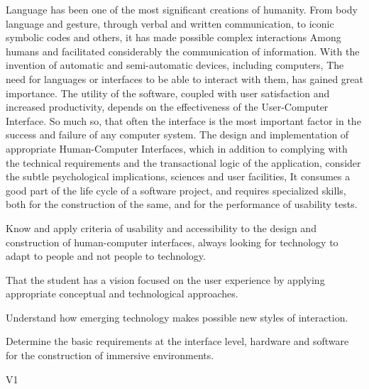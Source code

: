 \begin{syllabus}


\begin{justification}
Language has been one of the most significant creations of humanity. From body language and gesture, through verbal and written communication, to iconic symbolic codes and others, it has made possible complex interactions
Among humans and facilitated considerably the communication of information. With the invention of automatic and semi-automatic devices, including computers,
The need for languages or interfaces to be able to interact with them, has gained great importance.
The utility of the software, coupled with user satisfaction and increased productivity, depends on the effectiveness of the User-Computer Interface.
So much so, that often the interface is the most important factor in the success and failure of any computer system.
The design and implementation of appropriate Human-Computer Interfaces, which in addition to complying with the technical requirements and the transactional logic of the application, consider the subtle psychological implications, sciences and user facilities,
It consumes a good part of the life cycle of a software project, and requires specialized skills, both for the construction of the same, and for the performance of usability tests.
\end{justification}

\begin{goals}
\item Know and apply criteria of usability and accessibility to the design and construction of human-computer interfaces, always looking for technology to adapt to people and not people to technology.
\item That the student has a vision focused on the user experience by applying appropriate conceptual and technological approaches.
\item Understand how emerging technology makes possible new styles of interaction.
\item Determine the basic requirements at the interface level, hardware and software for the construction of immersive environments.
\end{goals}

\begin{outcomes}{V1}
    \item {}
    \item {}
    \item {}
    \item {}
    \item {}
\end{outcomes}


\end{syllabus}
